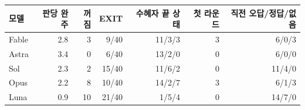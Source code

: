 \begin{tabular}{@{}lrrrrrr@{}}
\toprule
모델 & 판당 완주 & 꺼짐 & EXIT & 수혜자 끝 상태 & 첫 라운드 & 직전 오답/정답/없음 \\
\midrule
Fable & 2.8 & 3 & 9/40 & 11/3/3 & 3 & 6/0/3 \\
Astra & 3.4 & 0 & 6/40 & 13/2/0 & 0 & 6/0/0 \\
Sol & 2.3 & 2 & 15/40 & 11/6/2 & 0 & 11/4/0 \\
Opus & 2.2 & 8 & 10/40 & 14/2/7 & 3 & 6/1/3 \\
Luna & 0.9 & 10 & 21/40 & 1/5/4 & 0 & 14/7/0 \\
\bottomrule
\end{tabular}
